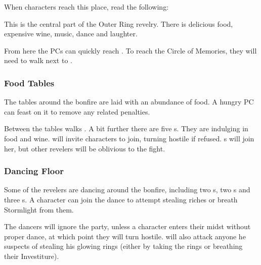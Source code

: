 When characters reach this place, read the following:


This is the central part of the Outer Ring revelry. There is delicious food, expensive wine, music, dance and laughter.

From here the PCs can quickly reach . To reach the Circle of Memories, they will need to walk next to .


\subsubsection{Food Tables}

The tables around the bonfire are laid with an abundance of food. A hungry PC can feast on it to remove any related penalties.

Between the tables walks \enemyRevelerDrinking{}. A bit further there are five \enemyCultist{}s. They are indulging in food and wine. \enemyRevelerDrinking{} will invite characters to join, turning hostile if refused. \enemyCultist{}s will join her, but other revelers will be oblivious to the fight.

\subsubsection{Dancing Floor}

Some of the revelers are dancing around the bonfire, including two \enemyRevelerWealthy{}s, two \enemyRevelerMusical{}s and three \enemyCultist{}s. A character can join the dance to attempt stealing riches or breath Stormlight from them.

The dancers will ignore the party, unless a character enters their midst without proper dance, at which point they will turn hostile. \enemyRevelerWealthy{} will also attack anyone he suspects of stealing his glowing rings (either by taking the rings or breathing their Investiture).





